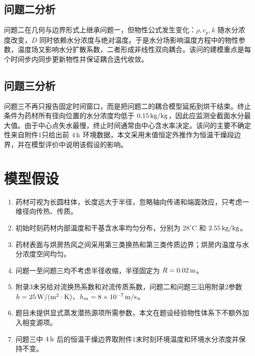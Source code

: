 \documentclass[UTF8,a4paper,12pt]{ctexart}
\numberwithin{equation}{section}
\begin{document}
\subsection{问题二分析}
问题二在几何与边界形式上继承问题一，但物性公式发生变化：$\rho,c_p,k$ 随水分浓度改变，$D$ 同时依赖水分浓度与绝对温度。于是水分场影响温度方程中的物性参数，温度场又影响水分扩散系数，二者形成非线性双向耦合。该问的建模重点是每个时间步内同步更新物性并保证耦合迭代收敛。

\subsection{问题三分析}
问题三不再只报告固定时间窗口，而是把问题二的耦合模型延拓到烘干结束。终止条件为药材所有径向位置的水分浓度均低于 $0.15\rm\,kg/kg$，因此应监测全截面水分最大值。由于中心点失水最慢，终止时间通常由中心含水率决定。该问的主要不确定性来自附件1只给出前 $4\rm\,h$ 环境数据，本文采用末值恒定外推作为恒温干燥段边界，并在模型评价中说明该假设的影响。

\section{模型假设}
\begin{enumerate}[label=\arabic*.,leftmargin=2.5em]
  \item 药材可视为长圆柱体，长度远大于半径，忽略轴向传递和端面效应，只考虑一维径向传热、传质。
  \item 初始时刻药材内部温度和干基含水率均匀分布，分别为 $28^\circ\mathrm C$ 和 $2.55\rm\,kg/kg$。
  \item 药材表面与烘房热风之间采用第三类换热和第三类传质边界；烘房内温度与水分浓度空间均匀。
  \item 问题一至问题三均不考虑半径收缩，半径固定为 $R=0.02\rm\,m$。
  \item 附录3未另给对流换热系数和对流传质系数，问题二和问题三沿用附录2参数 $h=25\rm\,W/(m^2\cdot K)$、$h_m=8\times10^{-7}\rm\,m/s$。
  \item 题目未提供显式蒸发潜热源项所需参数，本文在题设经验物性体系下不额外加入相变源项。
  \item 问题三中 $4\rm\,h$ 后的恒温干燥边界取附件1末时刻环境温度和环境水分浓度并保持不变。
\end{enumerate}
\end{document}
